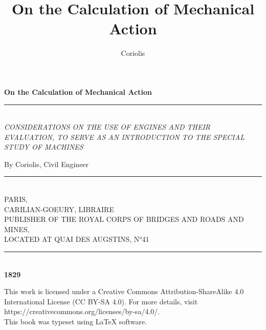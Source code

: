\documentclass{book}
\title{On the Calculation of Mechanical Action}
\author{Coriolis}
\newcommand{\booksubtitle}{CONSIDERATIONS ON THE USE OF ENGINES AND THEIR EVALUATION, 
TO SERVE AS AN INTRODUCTION TO THE SPECIAL STUDY OF MACHINES}
\begin{document}
\frontmatter

\begin{titlepage}
\begin{center}

\textbf{\fontsize{48}{54}\selectfont On the Calculation of Mechanical Action}

\par\noindent\rule{\textwidth}{4pt}\\

\textit{\booksubtitle}


    
\Large By Coriolis, Civil Engineer
\par\noindent\rule{\textwidth}{3pt}\\
PARIS, \\
\small CARILIAN-GOEURY, LIBRAIRE\\ 
PUBLISHER OF THE ROYAL CORPS OF BRIDGES AND ROADS AND MINES,\\ LOCATED AT QUAI DES AUGSTINS, N°41 
\\
\par\noindent\rule{\textwidth}{2pt}\\

\textbf{1829} 

\end{center}


\vspace{\fill}


\end{titlepage}
\restoregeometry

\thispagestyle{empty}
\newpage
This work is licensed under a Creative Commons Attribution-ShareAlike 4.0 International License (CC BY-SA 4.0). For more details, visit \\https://creativecommons.org/licenses/by-sa/4.0/.\\
\vspace{80}
This book was typeset using \LaTeX{} software.\\

\end{document}
